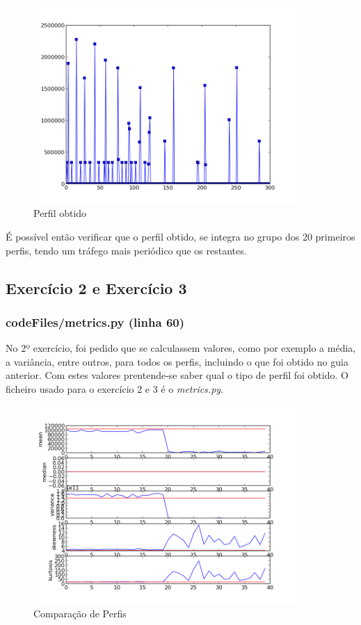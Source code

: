 \documentclass[pdftex,12pt,a4paper]{report}
\begin{document}
\begin{figure}[!htb]
\center
 \includegraphics[width=100mm,scale=1]{metrics/profile.png}
 \caption{Perfil obtido}
 \label{fig:profile}
\end{figure}

É possível então verificar que o perfil obtido, se integra no grupo dos 20 primeiros perfis, tendo um tráfego mais periódico que os restantes.

\newpage
\subsection{Exercício 2 e Exercício 3}
\subsubsection{codeFiles/metrics.py (linha 60)}

No 2º exercício, foi pedido que se calculassem valores, como por exemplo a média, a variância, entre outros, para todos os perfis, incluindo o que foi obtido no guia anterior. Com estes valores prentende-se saber qual o tipo de perfil foi obtido. O ficheiro usado para o exercício 2 e 3 é o \textit{metrics.py}.

\begin{figure}[!htb]
\center
 \includegraphics[width=100mm,scale=1]{metrics/compare_profile.png}
 \caption{Comparação de Perfis}
 \label{fig:compare_profile}
\end{figure}
\end{document}
